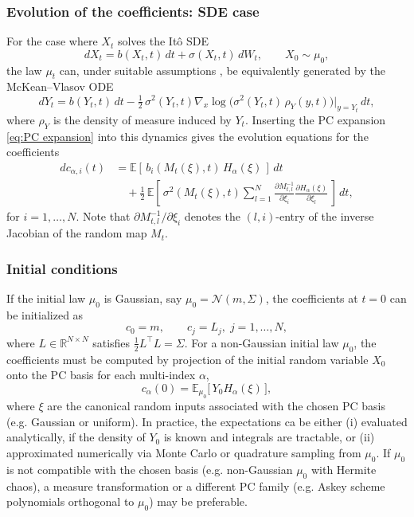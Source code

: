 \documentclass[11pt, a4paper, oneside, reqno]{amsart}
\begin{document}
\subsubsection{Evolution of the coefficients: SDE case}
\noindent For the case where $X_t$ solves the Itô SDE
\begin{equation}\label{eq:ito}
dX_t = b(X_t,t)\,dt + \sigma(X_t,t)\,dW_t, \qquad X_0 \sim \mu_0,
\end{equation}
the law $\mu_t$ can, under suitable assumptions \cite{gorjichaos}, be equivalently generated by the McKean–Vlasov ODE
\begin{equation}
dY_t = b(Y_t,t)\,dt - \tfrac{1}{2}\,\sigma^2(Y_t,t) 
\nabla_x \log\!\big(\sigma^2(Y_t,t)\,\rho_Y(y,t)\big)\big|_{y=Y_t}\,dt,
\end{equation}
where $\rho_Y$ is the density of measure induced by $Y_t$.
Inserting the PC expansion \eqref{eq:PC expansion} into this dynamics gives the evolution equations for the coefficients
\begin{align}\label{eq:coeff evolution SDE}
dc_{\alpha,i}(t) &= \mathbb{E}\left[\, b_i(M_t(\xi),t)\, H_\alpha(\xi)\,\right]\,dt \\
&\quad+ \tfrac{1}{2}\,\mathbb{E}\left[\, 
\sigma^2(M_t(\xi),t) 
\sum_{l=1}^N \frac{\partial M_{t,l}^{-1}}{\partial \xi_i} 
\frac{\partial H_\alpha(\xi)}{\partial \xi_l}
\,\right]\,dt, \nonumber
\end{align}
for $i=1,\dots,N$.  
Note that ${\partial M_{t,l}^{-1}}/{\partial \xi_i}$ denotes the $(l,i)$-entry of the inverse Jacobian of the random map $M_t$.  
\subsubsection{Initial conditions}
\noindent If the initial law $\mu_0$ is Gaussian, say $\mu_0=\mathcal{N}(m,\Sigma)$, the coefficients at $t=0$ can be initialized as
\[
c_0 = m, 
\qquad c_j = L_j,\; j=1,\dots,N,
\]
where $L\in\mathbb{R}^{N\times N}$ satisfies $\tfrac{1}{2}L^\top L = \Sigma$.  
For a non-Gaussian initial law $\mu_0$, the coefficients must be computed by projection of the initial random variable $X_0$ onto the PC basis for each multi-index $\alpha$, 
\[
c_\alpha(0) = \mathbb{E}_{\mu_0}\big[\, Y_0 H_\alpha(\xi)\,\big],
\]
where $\xi$ are the canonical random inputs associated with the chosen PC basis (e.g. Gaussian or uniform).  
In practice, the expectations ca be either (i) evaluated analytically, if the density of $Y_0$ is known and integrals are tractable, or (ii) approximated numerically via Monte Carlo or quadrature sampling from $\mu_0$.  
If $\mu_0$ is not compatible with the chosen basis (e.g. non-Gaussian $\mu_0$ with Hermite chaos), a measure transformation or a different PC family (e.g. Askey scheme polynomials orthogonal to $\mu_0$) may be preferable.  
\end{document}
